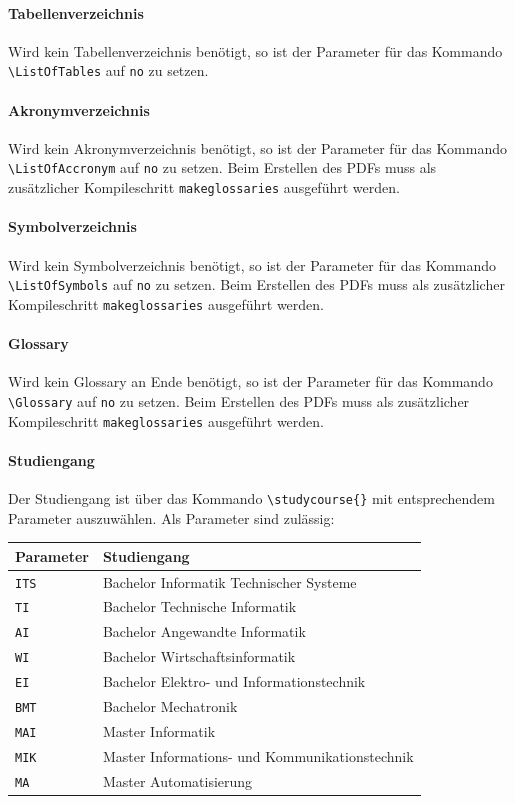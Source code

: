 \paragraph{Tabellenverzeichnis} Wird kein Tabellenverzeichnis benötigt, so ist der Parameter für das Kommando \texttt{\textbackslash ListOfTables} auf \texttt{no} zu setzen.

\paragraph{Akronymverzeichnis} Wird kein Akronymverzeichnis benötigt, so ist der Parameter für das Kommando \texttt{\textbackslash ListOfAccronym} auf \texttt{no} zu setzen. Beim Erstellen des PDFs muss als zusätzlicher Kompileschritt \texttt{makeglossaries} ausgeführt werden.

\paragraph{Symbolverzeichnis} Wird kein Symbolverzeichnis benötigt, so ist der Parameter für das Kommando \texttt{\textbackslash ListOfSymbols} auf \texttt{no} zu setzen. Beim Erstellen des PDFs muss als zusätzlicher Kompileschritt \texttt{makeglossaries} ausgeführt werden.

\paragraph{Glossary} Wird kein Glossary an Ende benötigt, so ist der Parameter für das Kommando \texttt{\textbackslash Glossary} auf \texttt{no} zu setzen. Beim Erstellen des PDFs muss als zusätzlicher Kompileschritt \texttt{makeglossaries} ausgeführt werden.

\paragraph{Studiengang} Der Studiengang ist über das Kommando
\texttt{\textbackslash studycourse\{\}} mit entsprechendem Parameter
auszuwählen. Als Parameter sind zulässig:

\begin{center}
  \begin {tabular}{ll}
    Parameter & Studiengang \\
    \hline
    \texttt{ITS} & Bachelor Informatik Technischer Systeme \\
    \texttt{TI} & Bachelor Technische Informatik \\
    \texttt{AI} & Bachelor Angewandte Informatik \\
    \texttt{WI} & Bachelor Wirtschaftsinformatik \\
    \texttt{EI} & Bachelor Elektro- und Informationstechnik \\
    \texttt{BMT} & Bachelor Mechatronik \\
    \texttt{MAI} & Master Informatik \\
    \texttt{MIK} & Master Informations- und Kommunikationstechnik \\
    \texttt{MA} & Master Automatisierung \\
  \end{tabular}
\end{center}

